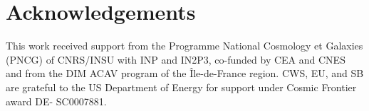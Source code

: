 \documentclass[fleqn,usenatbib]{rasti}
\begin{document}












\section*{Acknowledgements}
This work received support from the Programme National Cosmology et
Galaxies (PNCG) of CNRS/INSU with INP and IN2P3, co-funded by CEA
and CNES and from the DIM ACAV program of the Île-de-France region.
CWS, EU, and SB are grateful to the US Department of Energy for support under Cosmic Frontier award DE- SC0007881. 

  

  





\appendix

\end{document}
